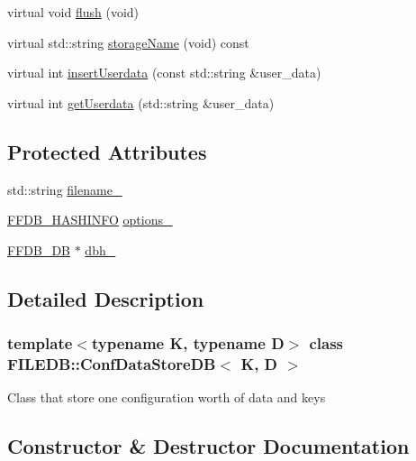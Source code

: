 \begin{DoxyCompactItemize}
\item 
virtual void \mbox{\hyperlink{classFILEDB_1_1ConfDataStoreDB_a982ae3b2108acbf75ab15a939fc7871b}{flush}} (void)
\item 
virtual std\+::string \mbox{\hyperlink{classFILEDB_1_1ConfDataStoreDB_acac74e3143398de6c5da068f37a762ee}{storage\+Name}} (void) const
\item 
virtual int \mbox{\hyperlink{classFILEDB_1_1ConfDataStoreDB_a8fa05198f3ff1f405fbdfc6a51f43d1a}{insert\+Userdata}} (const std\+::string \&user\+\_\+data)
\item 
virtual int \mbox{\hyperlink{classFILEDB_1_1ConfDataStoreDB_abf7ce0847e1d68f960836826d68c0079}{get\+Userdata}} (std\+::string \&user\+\_\+data)
\end{DoxyCompactItemize}
\subsection*{Protected Attributes}
\begin{DoxyCompactItemize}
\item 
std\+::string \mbox{\hyperlink{classFILEDB_1_1ConfDataStoreDB_a05dc0142a79f69fdc6dfa3cf50beea15}{filename\+\_\+}}
\item 
\mbox{\hyperlink{structFFDB__HASHINFO}{F\+F\+D\+B\+\_\+\+H\+A\+S\+H\+I\+N\+FO}} \mbox{\hyperlink{classFILEDB_1_1ConfDataStoreDB_a0969c71741392e7f0a151226e05fada2}{options\+\_\+}}
\item 
\mbox{\hyperlink{adat-devel_2other__libs_2filedb_2filehash_2ffdb__db_8h_a0b27b956926453a7a8141ea8e10f0df8}{F\+F\+D\+B\+\_\+\+DB}} $\ast$ \mbox{\hyperlink{classFILEDB_1_1ConfDataStoreDB_aa5e755cd462b3df8b2fcc74c78e9d90b}{dbh\+\_\+}}
\end{DoxyCompactItemize}


\subsection{Detailed Description}
\subsubsection*{template$<$typename K, typename D$>$\newline
class F\+I\+L\+E\+D\+B\+::\+Conf\+Data\+Store\+D\+B$<$ K, D $>$}

Class that store one configuration worth of data and keys 

\subsection{Constructor \& Destructor Documentation}
\mbox{\label{classFILEDB_1_1ConfDataStoreDB_a575d901daeccae08bcda5b2a60681e1b}} 

